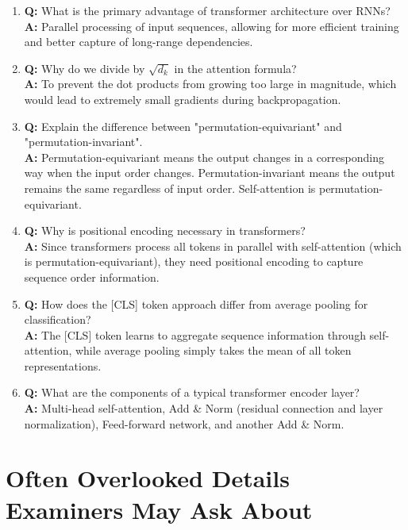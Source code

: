\begin{enumerate}
    \item \textbf{Q:} What is the primary advantage of transformer architecture over RNNs?\\
    \textbf{A:} Parallel processing of input sequences, allowing for more efficient training and better capture of long-range dependencies.

    \item \textbf{Q:} Why do we divide by $\sqrt{d_k}$ in the attention formula?\\
    \textbf{A:} To prevent the dot products from growing too large in magnitude, which would lead to extremely small gradients during backpropagation.

    \item \textbf{Q:} Explain the difference between "permutation-equivariant" and "permutation-invariant".\\
    \textbf{A:} Permutation-equivariant means the output changes in a corresponding way when the input order changes. Permutation-invariant means the output remains the same regardless of input order. Self-attention is permutation-equivariant.

    \item \textbf{Q:} Why is positional encoding necessary in transformers?\\
    \textbf{A:} Since transformers process all tokens in parallel with self-attention (which is permutation-equivariant), they need positional encoding to capture sequence order information.

    \item \textbf{Q:} How does the [CLS] token approach differ from average pooling for classification?\\
    \textbf{A:} The [CLS] token learns to aggregate sequence information through self-attention, while average pooling simply takes the mean of all token representations.

    \item \textbf{Q:} What are the components of a typical transformer encoder layer?\\
    \textbf{A:} Multi-head self-attention, Add \& Norm (residual connection and layer normalization), Feed-forward network, and another Add \& Norm.
\end{enumerate}

\vspace{1em}

\section*{Often Overlooked Details Examiners May Ask About}

